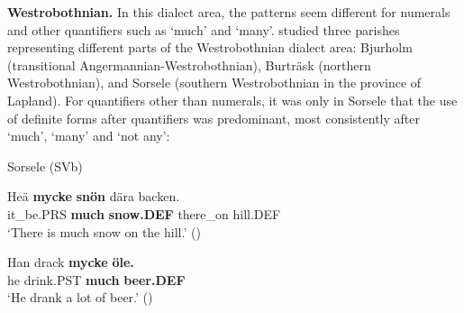 \textbf{Westrobothnian.} In this dialect area, the patterns seem different for numerals and other quantifiers such as ‘much’ and ‘many’. \citet{BergholmEtAl1999} studied three parishes representing different parts of the Westrobothnian dialect area: Bjurholm (transitional Angermannian-Westrobothnian), Burträsk (northern Westrobothnian), and Sorsele (southern Westrobothnian in the province of Lapland). For quantifiers other than numerals, it was only in Sorsele that the use of definite forms after quantifiers was predominant, most consistently after ‘much’, ‘many’ and ‘not any’:


\item 

Sorsele (SVb)



\item 


 \ea\label{}
\gll Heä  \textbf{mycke} \textbf{snön} dära  backen.\\


it\_be.PRS  \textbf{much} \textbf{snow.DEF} there\_on  hill.DEF\\

\glt ‘There is much snow on the hill.’ (\citet[24]{BergholmEtAl1999})

\z

\item 


 \ea\label{}
\gll Han  drack  \textbf{mycke} \textbf{öle.}\\


he  drink.PST  \textbf{much} \textbf{beer.DEF}\\

\glt ‘He drank a lot of beer.’ (\citet[24]{BergholmEtAl1999})

